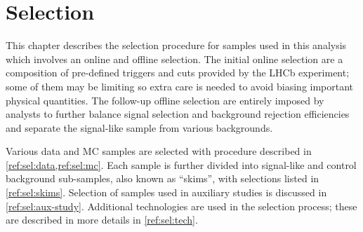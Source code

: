 \chapter{Selection}
\label{ref:sel}

This chapter describes the selection procedure for samples used in this
analysis which involves an online and offline selection.
The initial online selection are a composition of
pre-defined triggers and cuts provided by the LHCb experiment;
some of them may be limiting so extra care is needed to avoid biasing important
physical quantities.
The follow-up offline selection are entirely imposed by analysts
to further balance signal selection and background rejection efficiencies
and separate the signal-like sample from various backgrounds.

Various data and MC samples are selected with procedure described
in \cref{ref:sel:data,ref:sel:mc}.
Each sample is further divided into signal-like and control background
sub-samples, also known as ``skims'', with selections listed in
\cref{ref:sel:skims}.
Selection of samples used in auxiliary studies is discussed in
\cref{ref:sel:aux-study}.
Additional technologies are used in the selection process;
these are described in more details in
\cref{ref:sel:tech}.










